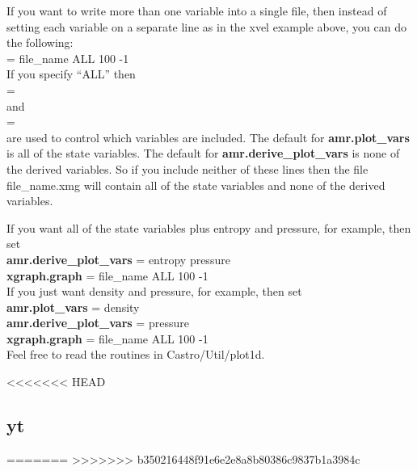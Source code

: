 If you want to write more than one variable into a single file, then instead of
setting each variable on a separate line as in the xvel example above,
you can do the following: \\

 = file\_name ALL 100 -1\\

\noindent If you specify ``ALL'' then \\

 = \\

\noindent and \\

 = \\

\noindent are used to control which variables are included.  The default for {\bf amr.plot\_vars}
is all of the state variables.  The default for {\bf amr.derive\_plot\_vars} is none of
the derived variables.  So if you include neither of these lines then the file 
file\_name.xmg will contain all of the state variables and none of the derived variables.

If you want all of the state variables plus entropy and pressure, for example, then set \\

{\bf amr.derive\_plot\_vars} = entropy pressure \\

{\bf xgraph.graph} = file\_name ALL 100 -1\\

If you just want density and pressure, for example, then set \\

{\bf amr.plot\_vars} =  density \\

{\bf amr.derive\_plot\_vars} = pressure \\

{\bf xgraph.graph} = file\_name ALL 100 -1\\ 

Feel free to read the routines in Castro/Util/plot1d.

<<<<<<< HEAD

\subsection{yt}

=======
>>>>>>> b350216448f91e6e2e8a8b80386c9837b1a3984c
